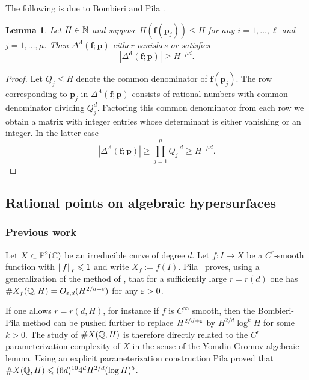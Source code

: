 \documentclass[reqno]{amsart}
\newtheorem{Lem}[Cor]{Lemma}{\bfseries}{\itshape}
\renewcommand\ge{\geqslant} \renewcommand\le{\leqslant}
\renewcommand\~[1]{\widetilde{#1}}
\def\vd{{\mathbf d}}
\def\vf{{\mathbf f}}
\def\vp{{\mathbf p}}
\begin{document}
The following is due to Bombieri and Pila \cite{bombieri-pila}.

\begin{Lem}\label{lem:bp-lower}
  Let $H\in{\mathbb N}$ and suppose $H(\vf(\vp_j))\le H$ for any
  $i=1,\ldots,\ell$ and $j=1,\ldots,\mu$. Then $\Delta^\Lambda(\vf;\vp)$
  either vanishes or satisfies
  \begin{equation}
    |\Delta^\vd(\vf;\vp)| \ge H^{-\mu d}.
  \end{equation}
\end{Lem}
\begin{proof}
  Let $Q_j\le H$ denote the common denominator of $\vf(\vp_j)$. The
  row corresponding to $\vp_j$ in $\Delta^\Lambda(\vf;\vp)$ consists
  of rational numbers with common denominator dividing
  $Q_j^d$. Factoring this common denominator from each row we obtain a
  matrix with integer entries whose determinant is either vanishing or
  an integer. In the latter case
  \begin{equation}
    |\Delta^\Lambda(\vf;\vp)| \ge \prod_{j=1}^\mu Q_j^{-d} \ge H^{-\mu d}.
  \end{equation}
\end{proof}

\subsection{Rational points on algebraic hypersurfaces}
\label{sec:alg-density}

\subsubsection{Previous work}
\label{sec:alg-density-history}

Let $X\subset{\mathbb P}^2({\mathbb C})$ be an irreducible curve of degree $d$. Let
$f:I\to X$ be a $C^r$-smooth function with $\norm{f}_r\le1$ and write
$X_f:=f(I)$. Pila~\cite{pila:density-Q} proves, using a generalization
of the method of \cite{bombieri-pila}, that for a sufficiently large
$r=r(d)$ one has $\#X_f({\mathbb Q},H)=O_{\varepsilon,d}(H^{2/d+\varepsilon})$ for any $\varepsilon>0$.

If one allows $r=r(d,H)$, for instance if $f$ is $C^\infty$ smooth,
then the Bombieri-Pila method can be pushed further to replace
$H^{2/d+\varepsilon}$ by $H^{2/d}\log^kH$ for some $k>0$. The study of
$\#X({\mathbb Q},H)$ is therefore directly related to the $C^r$ parameterization
complexity of $X$ in the sense of the Yomdin-Gromov algebraic
lemma. Using an explicit parameterization construction Pila
\cite{pila:pems} proved that
$\#X(\Q,H)\le(6d)^{10}4^dH^{2/d}(\log H)^5$.
\end{document}
